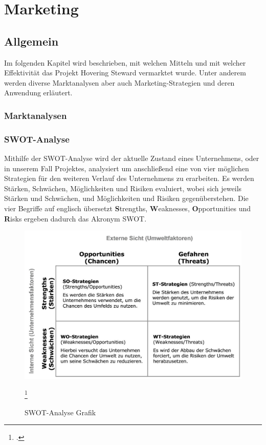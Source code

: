\chapter{Marketing}
\renewcommand{\kapitelautor}{Autor: Markus Kaiser}

\section{Allgemein}
Im folgenden Kapitel wird beschrieben, mit welchen Mitteln und mit welcher Effektivität
das Projekt Hovering Steward vermarktet wurde. Unter anderem werden diverse Marktanalysen
aber auch Marketing-Strategien und deren Anwendung erläutert.

  \subsection{Marktanalysen}
    \subsection*{SWOT-Analyse}
    Mithilfe der SWOT-Analyse wird der aktuelle Zustand eines Unternehmens, oder in unserem Fall Projektes, analysiert um anschließend eine von vier möglichen Strategien
    für den weiteren Verlauf des Unternehmens zu erarbeiten. Es werden Stärken, Schwächen, Möglichkeiten und Risiken evaluiert, wobei sich jeweils Stärken und Schwächen, und
    Möglichkeiten und Risiken gegenüberstehen. Die vier Begriffe auf englisch übersetzt \textbf{S}trengths, \textbf{W}eaknesses, \textbf{O}pportunities und \textbf{R}isks
    ergeben dadurch das Akronym SWOT.

    \begin{figure}[H]
      \begin{centering}
      \includegraphics[width = 1\textwidth]{Bilder/swot.jpg}
      \par\end{centering}
      \caption{SWOT-Analyse Grafik}
      \label{swot}
      \footcite{pic_swot}
    \end{figure}

